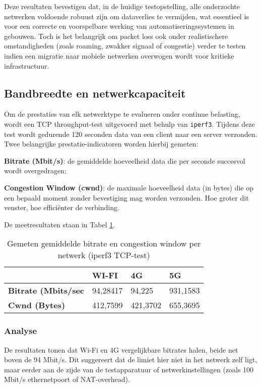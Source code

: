 Deze resultaten bevestigen dat, in de huidige testopstelling, alle onderzochte netwerken voldoende robuust zijn om dataverlies te vermijden, wat essentieel is voor een correcte en voorspelbare werking van automatiseringssystemen in gebouwen. Toch is het belangrijk om packet loss ook onder realistischere omstandigheden (zoals roaming, zwakker signaal of congestie) verder te testen indien een migratie naar mobiele netwerken overwogen wordt voor kritieke infrastructuur.

\subsection{Bandbreedte en netwerkcapaciteit}
Om de prestaties van elk netwerktype te evalueren onder continue belasting, wordt een TCP throughput-test uitgevoerd met behulp van \texttt{iperf3}. Tijdens deze test wordt gedurende 120 seconden data van een client naar een server verzonden. Twee belangrijke prestatie-indicatoren worden hierbij gemeten:

\textbf{Bitrate (Mbit/s)}: de gemiddelde hoeveelheid data die per seconde succesvol wordt overgedragen;

\textbf{Congestion Window (cwnd)}: de maximale hoeveelheid data (in bytes) die op een bepaald moment zonder bevestiging mag worden verzonden. Hoe groter dit venster, hoe efficiënter de verbinding.

De meetresultaten staan in Tabel \ref{tab:bandbreedte}.

\begin{table}[]
    \begin{tabular}{l|l|l|l|}
        \cline{2-4}
        & \textbf{WI-FI} & \textbf{4G} & \textbf{5G} \\ \hline
        \multicolumn{1}{|l|}{\textbf{Bitrate (Mbits/sec}} & 94,28417       & 94,225      & 931,1583    \\ \hline
        \multicolumn{1}{|l|}{\textbf{Cwnd (Bytes)}}       & 412,7599       & 421,3702    & 655,3695    \\ \hline
    \end{tabular}
    \caption{Gemeten gemiddelde bitrate en congestion window per netwerk (iperf3 TCP-test)}
    \label{tab:bandbreedte}
\end{table}

\subsubsection{Analyse}
De resultaten tonen dat Wi-Fi en 4G vergelijkbare bitrates halen, beide net boven de 94 Mbit/s. Dit suggereert dat de limiet hier niet in het netwerk zelf ligt, maar eerder aan de zijde van de testapparatuur of netwerkinstellingen (zoals 100 Mbit/s ethernetpoort of NAT-overhead).

